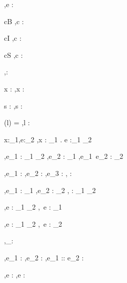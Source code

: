 




  {\Gamma,\Sigma \infers e : \tau}


  {c\in B}
  {\Gamma,\Sigma \infers c : \Bool}

  {c\in I}
  {\Gamma,\Sigma \infers c : \Int}

  {c\in S}
  {\Gamma,\Sigma \infers c : \String}


  { }
  {\Gamma,\Sigma \infers \unit : \Unit}


  {x : \tau \in \Gamma}
  {\Gamma,\Sigma \infers x : \tau}

  {s : \beta \in \Gamma}
  {\Gamma,\Sigma \infers s : \beta}

  {\Sigma(l) = \beta}
  {\Gamma,\Sigma \infers l : \Reference \beta}


  {\Gamma \cdot x:\tau_1,\Sigma \infers e:\tau_2}
  {\Gamma,\Sigma \infers \lambda x : \tau_1 . e :\tau_1 \to \tau_2}

  {\Gamma,\Sigma \infers e_1 : \tau_1 \to \tau_2 \Quad
   \Gamma,\Sigma \infers e_2 : \tau_1}
  {\Gamma,\Sigma \infers e_1\ e_2 : \tau_2}


  {\Gamma,\Sigma \infers e_1 : \Bool \Quad
   \Gamma,\Sigma \infers e_2 : \tau \Quad
   \Gamma,\Sigma \infers e_3 : \tau}
  {\Gamma,\Sigma \infers {} : \tau}


    {\Gamma,\Sigma \infers e_1 : \tau_1  \Quad
     \Gamma,\Sigma \infers e_2 : \tau_2}
    {\Gamma,\Sigma \infers {} : \tau_1 \times \tau_2}

  {\Gamma,\Sigma \infers e : \tau_1 \times \tau_2}
  {\Gamma,\Sigma \infers \Fst\ e : \tau_1}

    {\Gamma,\Sigma \infers e : \tau_1 \times \tau_2}
    {\Gamma,\Sigma \infers \Snd\ e : \tau_2}


  { }
  {\Gamma,\Sigma \infers [\ ]_\tau : \List \tau}

  {\Gamma,\Sigma \infers e_1 : \tau \Quad
   \Gamma,\Sigma \infers e_2 : \List \tau}
  {\Gamma,\Sigma \infers e_1 :: e_2 : \List \tau}

  {\Gamma,\Sigma \infers e : \List\tau}
  {\Gamma,\Sigma \infers \Head e : \tau}

